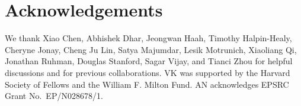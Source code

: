 \documentclass[aps,prl,reprint,superscriptaddress, longbibliography]{revtex4-1}
\begin{document}
\section*{Acknowledgements}
We thank Xiao Chen, Abhishek Dhar,  Jeongwan Haah, Timothy Halpin-Healy, 
Cheryne Jonay, 
Cheng Ju Lin, Satya Majumdar, Lesik Motrunich, Xiaoliang Qi, Jonathan Ruhman,  Douglas Stanford, Sagar Vijay, and Tianci Zhou for helpful discussions and for previous collaborations.  VK was supported by the Harvard Society of Fellows and the William F. Milton Fund.  
AN acknowledges EPSRC Grant No.~EP/N028678/1. 



\begin{appendix}


\end{appendix}
\end{document}
